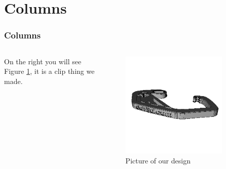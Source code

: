 \documentclass{beamer}
\begin{document}
\section{Columns}
\begin{frame}
\frametitle{Columns}
\begin{columns}

    On the right you will see Figure \ref{fig:clip}, it is a clip thing we made.

    \begin{figure}
        \centering

        \includegraphics[height=0.85\textheight,width=0.85\textwidth,keepaspectratio]{clip.png}
        \caption{Picture of our design}
        \label{fig:clip}
    \end{figure}


\end{columns}
\end{frame}
\end{document}
